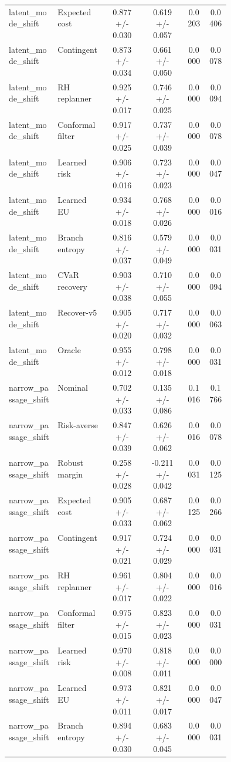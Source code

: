 \documentclass{article}
\begin{document}
\begin{center}
\begin{longtable}{p{0.22\linewidth}p{0.22\linewidth}cccc}
latent\_mode\_shift & Expected cost & 0.877 +/- 0.030 & 0.619 +/- 0.057 & 0.0203 & 0.0406\\
latent\_mode\_shift & Contingent & 0.873 +/- 0.034 & 0.661 +/- 0.050 & 0.0000 & 0.0078\\
latent\_mode\_shift & RH replanner & 0.925 +/- 0.017 & 0.746 +/- 0.025 & 0.0000 & 0.0094\\
latent\_mode\_shift & Conformal filter & 0.917 +/- 0.025 & 0.737 +/- 0.039 & 0.0000 & 0.0078\\
latent\_mode\_shift & Learned risk & 0.906 +/- 0.016 & 0.723 +/- 0.023 & 0.0000 & 0.0047\\
latent\_mode\_shift & Learned EU & 0.934 +/- 0.018 & 0.768 +/- 0.026 & 0.0000 & 0.0016\\
latent\_mode\_shift & Branch entropy & 0.816 +/- 0.037 & 0.579 +/- 0.049 & 0.0000 & 0.0031\\
latent\_mode\_shift & CVaR recovery & 0.903 +/- 0.038 & 0.710 +/- 0.055 & 0.0000 & 0.0094\\
latent\_mode\_shift & Recover-v5 & 0.905 +/- 0.020 & 0.717 +/- 0.032 & 0.0000 & 0.0063\\
latent\_mode\_shift & Oracle & 0.955 +/- 0.012 & 0.798 +/- 0.018 & 0.0000 & 0.0031\\
narrow\_passage\_shift & Nominal & 0.702 +/- 0.033 & 0.135 +/- 0.086 & 0.1016 & 0.1766\\
narrow\_passage\_shift & Risk-averse & 0.847 +/- 0.039 & 0.626 +/- 0.062 & 0.0016 & 0.0078\\
narrow\_passage\_shift & Robust margin & 0.258 +/- 0.028 & -0.211 +/- 0.042 & 0.0031 & 0.0125\\
narrow\_passage\_shift & Expected cost & 0.905 +/- 0.033 & 0.687 +/- 0.062 & 0.0125 & 0.0266\\
narrow\_passage\_shift & Contingent & 0.917 +/- 0.021 & 0.724 +/- 0.029 & 0.0000 & 0.0031\\
narrow\_passage\_shift & RH replanner & 0.961 +/- 0.017 & 0.804 +/- 0.022 & 0.0000 & 0.0016\\
narrow\_passage\_shift & Conformal filter & 0.975 +/- 0.015 & 0.823 +/- 0.023 & 0.0000 & 0.0031\\
narrow\_passage\_shift & Learned risk & 0.970 +/- 0.008 & 0.818 +/- 0.011 & 0.0000 & 0.0000\\
narrow\_passage\_shift & Learned EU & 0.973 +/- 0.011 & 0.821 +/- 0.017 & 0.0000 & 0.0047\\
narrow\_passage\_shift & Branch entropy & 0.894 +/- 0.030 & 0.683 +/- 0.045 & 0.0000 & 0.0031\\

\end{longtable}
\end{center}
\end{document}
